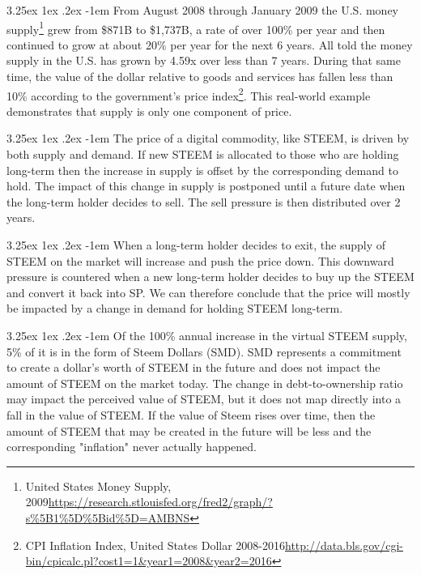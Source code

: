 \documentclass{article}
\makeatletter
\renewcommand\paragraph{\@startsection{paragraph}{5}{\z@}%
  {3.25ex \@plus1ex \@minus.2ex}%
  {-1em}%
  {\normalfont\normalsize\bfseries}}
\makeatother
\begin{document}
            \paragraph{}
                From August 2008 through January 2009 the U.S. money supply\footnote{United States Money Supply, 2009\newline\url{https://research.stlouisfed.org/fred2/graph/?s\%5B1\%5D\%5Bid\%5D=AMBNS}} grew from \$871B to \$1,737B, a rate of over 100\% per year and then continued to grow at about 20\% per year for the next 6 years. All told the money supply in the U.S. has grown by 4.59x over less than 7 years. During that same time, the value of the dollar relative to goods and services has fallen less than 10\% according to the government's price index\footnote{CPI Inflation Index, United States Dollar 2008-2016\newline\url{http://data.bls.gov/cgi-bin/cpicalc.pl?cost1=1&year1=2008&year2=2016}}. This real-world example demonstrates that supply is only one component of price.

            \paragraph{}
                The price of a digital commodity, like STEEM, is driven by both supply and demand. If new STEEM is allocated to those who are holding long-term then the increase in supply is offset by the corresponding demand to hold. The impact of this change in supply is postponed until a future date when the long-term holder decides to sell. The sell pressure is then distributed over 2 years.

            \paragraph{}
                When a long-term holder decides to exit, the supply of STEEM on the market will increase and push the price down. This downward pressure is countered when a new long-term holder decides to buy up the STEEM and convert it back into SP. We can therefore conclude that the price will mostly be impacted by a change in demand for holding STEEM long-term.

            \paragraph{}
                Of the 100\% annual increase in the virtual STEEM supply, 5\% of it is in the form of Steem Dollars (SMD). SMD represents a commitment to create a dollar's worth of STEEM in the future and does not impact the amount of STEEM on the market today. The change in debt-to-ownership ratio may impact the perceived value of STEEM, but it does not map directly into a fall in the value of STEEM. If the value of Steem rises over time, then the amount of STEEM that may be created in the future will be less and the corresponding "inflation" never actually happened.
\end{document}
